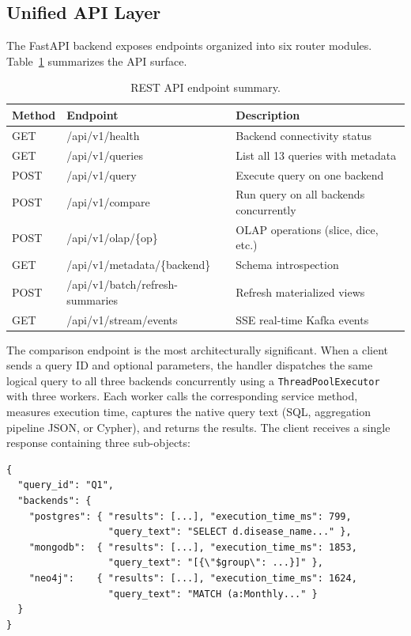 \documentclass[12pt,a4paper]{article}
\begin{document}
\subsection{Unified API Layer}

The FastAPI backend exposes endpoints organized into six router modules. Table~\ref{tab:endpoints} summarizes the API surface.

\begin{table}[H]
\centering
\caption{REST API endpoint summary.}
\label{tab:endpoints}
\begin{tabular}{lll}
\toprule
\textbf{Method} & \textbf{Endpoint} & \textbf{Description} \\
\midrule
GET & /api/v1/health & Backend connectivity status \\
GET & /api/v1/queries & List all 13 queries with metadata \\
POST & /api/v1/query & Execute query on one backend \\
POST & /api/v1/compare & Run query on all backends concurrently \\
POST & /api/v1/olap/\{op\} & OLAP operations (slice, dice, etc.) \\
GET & /api/v1/metadata/\{backend\} & Schema introspection \\
POST & /api/v1/batch/refresh-summaries & Refresh materialized views \\
GET & /api/v1/stream/events & SSE real-time Kafka events \\
\bottomrule
\end{tabular}
\end{table}

The comparison endpoint is the most architecturally significant. When a client sends a query ID and optional parameters, the handler dispatches the same logical query to all three backends concurrently using a \texttt{ThreadPoolExecutor} with three workers. Each worker calls the corresponding service method, measures execution time, captures the native query text (SQL, aggregation pipeline JSON, or Cypher), and returns the results. The client receives a single response containing three sub-objects:

\begin{lstlisting}[language={}, caption={Comparison endpoint response structure.}]
{
  "query_id": "Q1",
  "backends": {
    "postgres": { "results": [...], "execution_time_ms": 799,
                  "query_text": "SELECT d.disease_name..." },
    "mongodb":  { "results": [...], "execution_time_ms": 1853,
                  "query_text": "[{\"$group\": ...}]" },
    "neo4j":    { "results": [...], "execution_time_ms": 1624,
                  "query_text": "MATCH (a:Monthly..." }
  }
}
\end{lstlisting}
\end{document}
